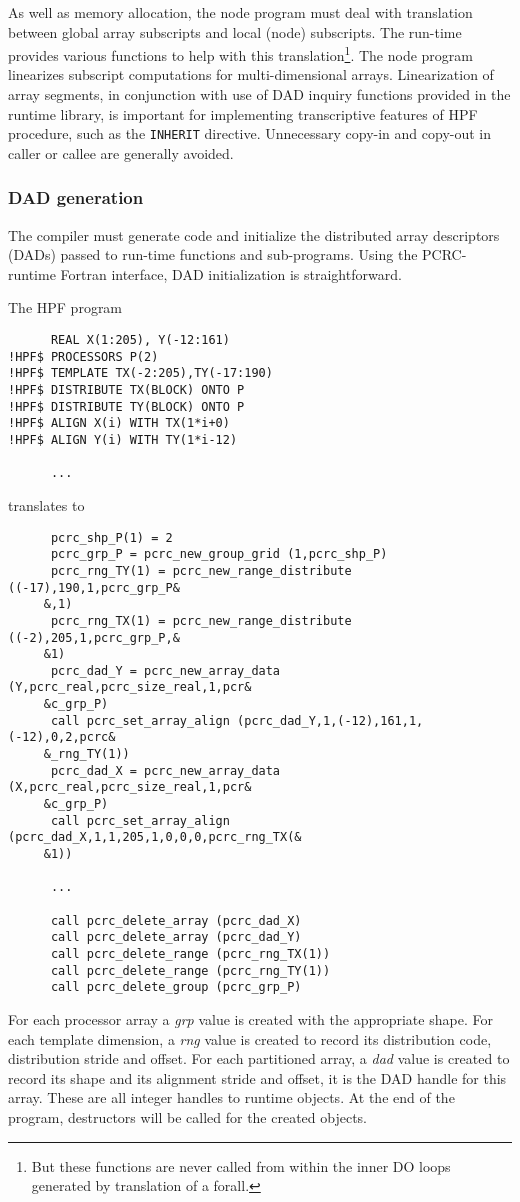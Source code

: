As well as memory allocation, the node program must
deal with translation between global array subscripts and local (node)
subscripts.  The run-time provides various functions to help with this
translation\footnote{But these functions are never called from within
the inner DO loops generated by translation of a forall.}.  The node
program linearizes subscript computations for multi-dimensional
arrays.  Linearization of array segments, in conjunction with use of DAD
inquiry functions provided in the runtime library, is important for
implementing transcriptive features of HPF procedure, such as the
\texttt{INHERIT} directive.  Unnecessary copy-in and copy-out in caller
or callee are generally avoided.


\subsubsection*{DAD generation}

The compiler must generate code and initialize the distributed array
descriptors (DADs) passed to run-time functions and sub-pro\-grams.
Using the PCRC-runtime Fortran interface, DAD initialization is
straightforward.

The HPF program 
\small
\begin{verbatim}
      REAL X(1:205), Y(-12:161)
!HPF$ PROCESSORS P(2)
!HPF$ TEMPLATE TX(-2:205),TY(-17:190)
!HPF$ DISTRIBUTE TX(BLOCK) ONTO P
!HPF$ DISTRIBUTE TY(BLOCK) ONTO P
!HPF$ ALIGN X(i) WITH TX(1*i+0)
!HPF$ ALIGN Y(i) WITH TY(1*i-12)

      ...
\end{verbatim}
\normalsize
translates to
\scriptsize
\begin{verbatim}
      pcrc_shp_P(1) = 2
      pcrc_grp_P = pcrc_new_group_grid (1,pcrc_shp_P)
      pcrc_rng_TY(1) = pcrc_new_range_distribute ((-17),190,1,pcrc_grp_P&
     &,1)
      pcrc_rng_TX(1) = pcrc_new_range_distribute ((-2),205,1,pcrc_grp_P,&
     &1)
      pcrc_dad_Y = pcrc_new_array_data (Y,pcrc_real,pcrc_size_real,1,pcr&
     &c_grp_P)
      call pcrc_set_array_align (pcrc_dad_Y,1,(-12),161,1,(-12),0,2,pcrc&
     &_rng_TY(1))
      pcrc_dad_X = pcrc_new_array_data (X,pcrc_real,pcrc_size_real,1,pcr&
     &c_grp_P)
      call pcrc_set_array_align (pcrc_dad_X,1,1,205,1,0,0,0,pcrc_rng_TX(&
     &1))

      ...

      call pcrc_delete_array (pcrc_dad_X)
      call pcrc_delete_array (pcrc_dad_Y)
      call pcrc_delete_range (pcrc_rng_TX(1))
      call pcrc_delete_range (pcrc_rng_TY(1))
      call pcrc_delete_group (pcrc_grp_P)
\end{verbatim}
\normalsize
For each processor array a {\em grp} value is created with the
appropriate shape.  For each template dimension, a {\em rng} value is
created to record its distribution code, distribution stride and
offset.  For each partitioned array, a {\em dad} value is created to
record its shape and its alignment stride and offset, it is the DAD
handle for this array.  These are all integer handles to runtime
objects.  At the end of the program, destructors will be called for the
created objects.

